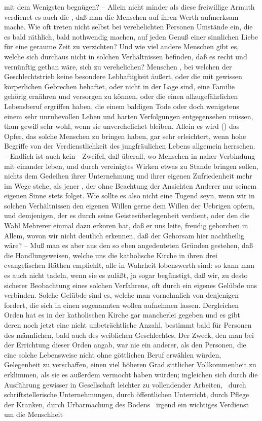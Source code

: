 \begin{RWanm}
mit dem Wenigsten begnügen? -- Allein nicht minder als diese freiwillige Armuth verdienet es auch die , daß man die Menschen auf ihren Werth aufmerksam mache. Wie oft treten nicht selbst bei verehelichten Personen Umstände ein, die es bald räthlich, bald nothwendig machen, auf jeden Genuß einer sinnlichen Liebe für eine geraume Zeit zu verzichten? Und wie viel andere Menschen gibt es, welche sich durchaus nicht in solchen Verhältnissen befinden, daß es recht und vernünftig gethan wäre, sich zu verehelichen? Menschen \zB , bei welchen der Geschlechtstrieb keine besondere Lebhaftigkeit äußert, oder die mit gewissen körperlichen Gebrechen behaftet, oder nicht in der Lage sind, eine Familie gehörig ernähren und versorgen zu können, oder die einen allzugefährlichen Lebensberuf ergriffen haben, die einem baldigen Tode oder doch wenigstens einem sehr unruhevollen Leben und harten Verfolgungen entgegensehen müssen, thun gewiß sehr wohl, wenn sie unverehelichet bleiben. Allein es wird () das Opfer, das solche Menschen zu bringen haben, gar sehr erleichtert, wenn hohe Begriffe von der Verdienstlichkeit des jungfräulichen Lebens allgemein herrschen. -- Endlich ist auch kein~\ Zweifel, daß überall, wo Menschen in naher Verbindung mit einander leben, und durch vereinigtes Wirken etwas zu Stande bringen sollen, nichts dem Gedeihen ihrer Unternehmung und ihrer eigenen Zufriedenheit mehr im Wege stehe, als jener , der ohne Beachtung der Ansichten Anderer nur seinem eigenen Sinne stets folget. Wie sollte es also nicht eine Tugend seyn, wenn wir in solchen Verhältnissen den eigenen Willen gerne dem Willen der Uebrigen opfern, und demjenigen, der es durch seine Geistesüberlegenheit verdient, oder den die Wahl Mehrerer einmal dazu erkoren hat, daß er uns leite, freudig gehorchen in Allem, wovon wir nicht deutlich erkennen, daß der Gehorsam hier nachtheilig wäre? -- Muß man es aber aus den so eben angedeuteten Gründen gestehen, daß die Handlungsweisen, welche uns die katholische Kirche in ihren drei evangelischen Räthen empfiehlt, alle in Wahrheit lobenswerth sind: so kann man es auch nicht tadeln, wenn sie es zuläßt, ja sogar begünstigt, daß wir, zu desto sicherer Beobachtung eines solchen Verfahrens, oft durch ein eigenes Gelübde uns verbinden. Solche Gelübde sind es, welche man vornehmlich von denjenigen fordert, die sich in einen sogenannten  wollen aufnehmen lassen. Dergleichen Orden hat es in der katholischen Kirche gar mancherlei gegeben und es gibt deren noch jetzt eine nicht unbeträchtliche Anzahl, bestimmt bald für Personen des männlichen, bald auch des weiblichen Geschlechtes. Der Zweck, den man bei der Errichtung dieser Orden angab, war nie ein anderer, als den Personen, die eine solche Lebensweise nicht ohne göttlichen Beruf erwählen würden, Gelegenheit zu verschaffen, einen viel höheren Grad sittlicher Vollkommenheit zu erklimmen, als sie es außerdem vermocht haben würden; ingleichen sich durch die Ausführung gewisser in Gesellschaft leichter zu vollendender Arbeiten, \zB\  durch schriftstellerische Unternehmungen, durch öffentlichen Unterricht, durch Pflege der Kranken, durch Urbarmachung des Bodens \udgl\  irgend ein wichtiges Verdienst um die Menschheit 
\end{RWanm}
